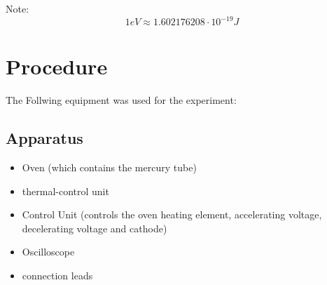 \documentclass[12pt]{article}
\begin{document}
Note:
\begin{equation}
    1eV \approx 1.602176208 \cdot 10^{-19}J
\end{equation}

\section{Procedure}



The Follwing equipment was used for the experiment:
\subsection{Apparatus}
\begin{itemize}
    \item Oven (which contains the mercury tube)
    \item thermal-control unit
    \item Control Unit (controls the oven heating element, accelerating voltage, 
        decelerating voltage and cathode)
    \item Oscilloscope
    \item connection leads
\end{itemize}
\end{document}
